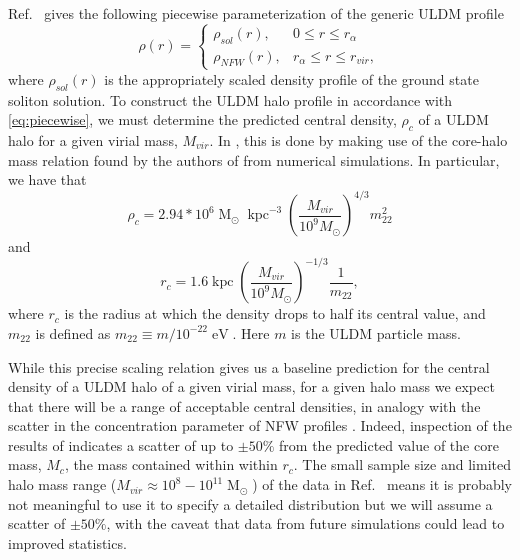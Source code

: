 \documentclass[a4paper,11pt]{article}
\begin{document}
Ref.~\cite{Robles:2018fur} gives the following piecewise parameterization of the generic ULDM profile 
%
\begin{equation}\label{eq:piecewise}
     \rho(r)=
    \begin{cases}
      \rho_{sol}(r), & 0\leq r \leq r_{\alpha} \\
      \rho_{NFW}(r), & r_{\alpha}\leq r \leq r_{vir},
    \end{cases}
\end{equation}
%
where $\rho_{sol}(r)$ is the appropriately scaled density profile of the ground state soliton solution. 
To construct the ULDM halo profile in accordance with \ref{eq:piecewise}, we must determine the predicted central density, $\rho_c$ of a ULDM halo for a given virial mass, $M_{vir}$. In \cite{Robles:2018fur}, this is done by making use of the core-halo mass relation found by the authors of \cite{Schive:2014hza} from numerical simulations. In particular, we have that 
\begin{equation}\label{eq:central_dens}
    \rho_c = 2.94*10^6 \operatorname{M}_{\odot}\operatorname{kpc}^{-3}\left(\frac{M_{vir}}{10^9 M_{\odot}}\right)^{4/3}m_{22}^{2}
\end{equation}
and 
\begin{equation}
    r_c = 1.6 \operatorname{kpc}\left(\frac{M_{vir}}{10^9 M_{\odot}}\right)^{-1/3}\frac{1}{m_{22}},
\end{equation}
where $r_c$ is the radius at which the density drops to half its central value, and $m_{22}$ is defined as $m_{22} \equiv m / 10^{-22} \operatorname{eV}$. Here $m$ is the ULDM particle mass. 

While this precise scaling relation gives us a baseline prediction for the central density of a ULDM halo of a given virial mass, for a given halo mass we expect that there will be a range of acceptable central densities, in analogy with the scatter in the concentration parameter of NFW profiles \cite{Maccio:2008pcd}. Indeed, inspection of the results of \cite{Schive:2014hza} indicates a scatter of up to $\pm 50\%$ from the  predicted value of the core mass, $M_c$, the mass contained within  within $r_c$. The small sample size and limited halo mass range ($ M_{vir} \approx 10^8-10^{11} \operatorname{M}_{\odot}$)  of the data in Ref.~\cite{Schive:2014hza} means it is probably not meaningful to use it to specify a detailed distribution but we will assume a scatter of $\pm 50\%$, with the caveat that data from future simulations could lead to improved statistics.
\end{document}
